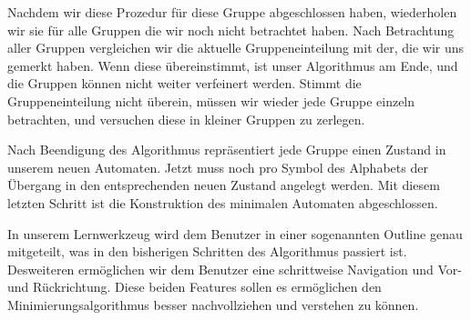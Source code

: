 Nachdem wir diese Prozedur für diese Gruppe
abgeschlossen haben, wiederholen wir sie für alle Gruppen die wir noch nicht
betrachtet haben. Nach Betrachtung aller Gruppen vergleichen wir die aktuelle
Gruppeneinteilung mit der, die wir uns gemerkt haben. Wenn diese übereinstimmt,
ist unser Algorithmus am Ende, und die Gruppen können nicht weiter verfeinert
werden. Stimmt die Gruppeneinteilung nicht überein, müssen wir wieder jede
Gruppe einzeln betrachten, und versuchen diese in kleiner Gruppen zu
zerlegen.\vspace{10pt}

Nach Beendigung des Algorithmus repräsentiert jede Gruppe einen Zustand
in unserem neuen Automaten. Jetzt muss noch pro Symbol des Alphabets der
Übergang in den entsprechenden neuen Zustand angelegt werden. Mit diesem
letzten Schritt ist die Konstruktion des minimalen Automaten
abgeschlossen.\vspace{10pt}

In unserem Lernwerkzeug wird dem Benutzer in einer sogenannten Outline genau
mitgeteilt, was in den bisherigen Schritten des Algorithmus passiert ist.
Desweiteren ermöglichen wir dem Benutzer eine schrittweise Navigation und Vor-
und Rückrichtung. Diese beiden Features sollen es ermöglichen den
Minimierungsalgorithmus besser nachvollziehen und verstehen zu
können.\vspace{10pt}
